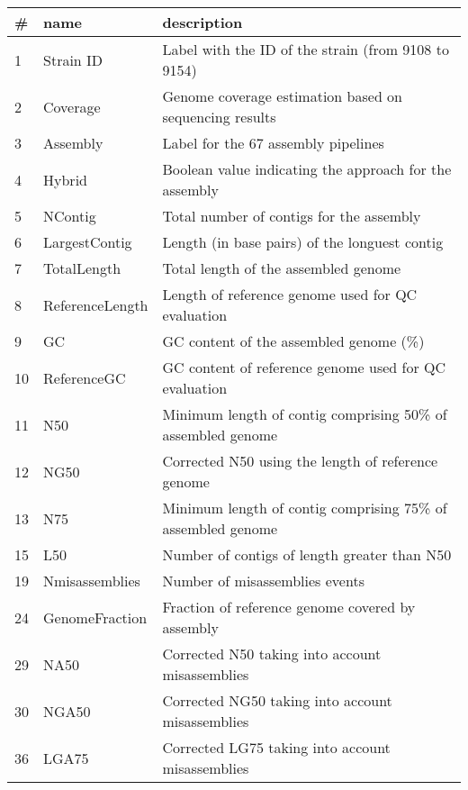 \documentclass[11pt, a4paper,titlepage]{article}
\begin{document}
\begin{table}[h]
  \centering
  \begin{tabular}{|l|l|l|}
    \hline
    \# & name            & description                                                  \\ \hline
    1  & Strain ID       & Label with the ID of the strain (from 9108 to 9154)          \\
    2  & Coverage        & Genome coverage estimation based on sequencing results       \\
    3  & Assembly        & Label for the 67 assembly pipelines                          \\
    4  & Hybrid          & Boolean value indicating the approach for the assembly       \\ 
    5  & NContig         & Total number of contigs for the assembly                     \\
    6  & LargestContig   & Length (in base pairs) of the longuest contig                \\
    7  & TotalLength     & Total length of the assembled genome                         \\ 
    8  & ReferenceLength & Length of reference genome used for QC evaluation            \\ 
    9  & GC              & GC content of the assembled genome (\%)                      \\ 
    10 & ReferenceGC     & GC content of reference genome used for QC evaluation        \\
    11 & N50             & Minimum length of contig comprising 50\% of assembled genome \\ 
    12 & NG50            & Corrected N50 using the length of reference genome           \\ 
    13 & N75             & Minimum length of contig comprising 75\% of assembled genome \\ 
    15 & L50             & Number of contigs of length greater than N50                 \\ 
    19 & Nmisassemblies  & Number of misassemblies events                               \\ 
    24 & GenomeFraction  & Fraction of reference genome covered by assembly             \\ 
    29 & NA50            & Corrected N50 taking into account misassemblies              \\ 
    30 & NGA50           & Corrected NG50 taking into account misassemblies             \\ 
    36 & LGA75           & Corrected LG75 taking into account misassemblies             \\ \hline
  \end{tabular}
\end{table}

 

\end{document}
